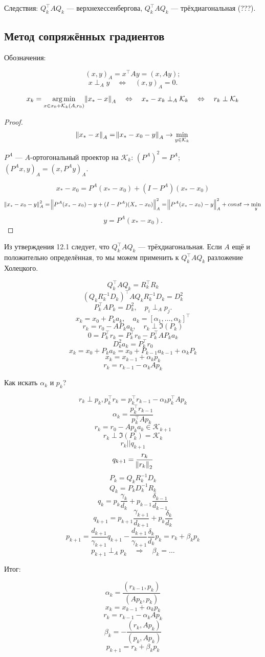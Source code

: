 Следствия: $Q_k^\top A Q_k$ --- верхнехессенбергова, $Q_k^\top A Q_k$ ---
трёхдиагональная (???).

\subsection{Метод сопряжённых градиентов}

Обозначения:

\[
    (x, y)_A = x^\top A y = (x, A y);
\]
\[
    x \perp_A y \quad\Leftrightarrow\quad (x, y)_A = 0.
\]

\begin{point}
    \[
        x_k = \operatorname*{\arg \min}_{x \in x_0 + \mathcal{K}_k(A, r_0)} \norm{x_* - x}_A
        \quad\Leftrightarrow\quad x_* - x_k \perp_A \mathcal{K}_k
        \quad\Leftrightarrow\quad r_k \perp \mathcal{K}_k
    \]
\end{point}

\begin{proof}
    \[
        \norm{x_* - x}_A = \norm{x_* - x_0 - y}_A \to \min_{y \in \mathcal{K}_k}
    \]

    $P^A$ --- $A$-ортогональный проектор на $\mathcal{K}_k$: $(P^A)^2 = P^A$;
    $(P^A x, y)_A = (x, P^A y)_A$.

    \[
        x_* - x_0 = P^A (x_* - x_0) + (I - P^A) (x_* - x_0)
    \]
    \[
        \norm{x_* - x_0 - y}_A^2 = \norm{P^A (x_* - x_0) - y
            + (I - P^A)(X_* - x_0)}_A^2
        = \norm{P^A (x_* - x_0) - y}_A^2 + const \to \min_y
    \]
    \[
        y = P^A (x_* - x_0).
    \]
\end{proof}

Из утверждения 12.1 следует, что $Q_k^\top A Q_k$ --- трёхдиагональная. Если $A$
ещё и положительно определённая, то мы можем применить к $Q_k^\top A Q_k$
разложение Холецкого.

\[
    Q_k^\top A Q_k = R_k^\top R_k
\]
\[
    (Q_k R_k^{-1} D_k)^\top A Q_k R_k^{-1} D_k = D_k^2
\]
\[
    P_k^\top A P_k = D_k^2, \quad p_i \perp_A p_j.
\]
\[
    x_k = x_0 + P_k a_k, \quad a_k = [\alpha_1, \dots, \alpha_k]^\top
\]
\[
    r_k = r_0 - A P_k a_k, \quad r_k \perp \Im(P_k)
\]
\[
    0 = P_k^\top r_k = P_k^\top r_0 - P_k^\top A P_k a_k
\]
\[
    D_k^2 a_k = P_k^\top r_0
\]
\[
    x_k = x_0 + P_k a_k = x_0 + P_{k - 1} a_{k - 1} + \alpha_k P_k
\]
\[
    x_k = x_{k - 1} + \alpha_k p_k
\]
\[
    r_k = r_{k - 1} - \alpha_k A p_k
\]

Как искать $\alpha_k$ и $p_k$?

\[
    r_k \perp p_k, p_k^\top r_k = p_k^\top r_{k - 1} - \alpha_k p_k^\top A p_k
\]
\[
    \alpha_k = \frac{p_k^\top r_{k - 1}}{p_k^\top A p_k}
\]
\[
    r_k = r_0 - A p_k a_k \in \mathcal{K}_{k + 1}
\]
\[
    r_k \perp \Im(P_k) = \mathcal{K}_k
\]
\[
    r_k || q_{k + 1}
\]
\[
    q_{k + 1} = \frac{r_k}{\norm{r_k}_2}
\]
\[
    P_k = Q_k R_k^{-1} D_k
\]
\[
    Q_k = P_k D_k^{-1} R_k
\]
\[
    q_k = p_k \frac{\gamma_k}{d_k} + p_{k - 1} \frac{\delta_{k - 1}}{d_{k - 1}}
\]
\[
    q_{k + 1} = p_{k + 1} \frac{\gamma_{k + 1}}{d_{k + 1}}
        + p_k \frac{\delta_k}{d_k}
\]
\[
    p_{k + 1} = \frac{d_{k + 1}}{\gamma_{k + 1}} q_{k + 1}
        - \frac{d_{k + 1}}{\gamma_{k + 1}} \frac{\delta_k}{d_k} p_k
    = r_k + \beta_k p_k
\]
\[
    p_{k + 1} \perp_A p_k \quad\Rightarrow\quad \beta_k = \dots
\]

Итог:

\[
    \alpha_k = \frac{(r_{k - 1}, p_k)}{(A p_k, p_k)}
\]
\[
    x_k = x_{k - 1} + \alpha_k p_k
\]
\[
    r_k = r_{k - 1} - \alpha_k A p_k
\]
\[
    \beta_k = - \frac{(r_k, A p_k)}{(p_k, A p_k)}
\]
\[
    p_{k + 1} = r_k + \beta_k p_k
\]
